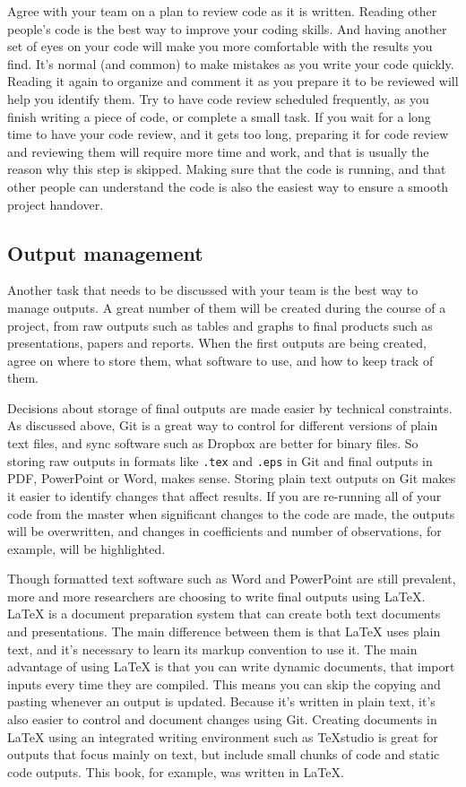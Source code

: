 Agree with your team on a plan to review code as it is written.
Reading other people's code is the best way to improve your coding skills.
And having another set of eyes on your code will make you more comfortable with the results you find.
It's normal (and common) to make mistakes as you write your code quickly.
Reading it again to organize and comment it as you prepare it to be reviewed will help you identify them.
Try to have code review scheduled frequently, as you finish writing a piece of code, or complete a small task.
If you wait for a long time to have your code review, and it gets too long,
preparing it for code review and reviewing them will require more time and work,
and that is usually the reason why this step is skipped.
Making sure that the code is running,
and that other people can understand the code is also the easiest way to ensure a smooth project handover.

\subsection{Output management}

Another task that needs to be discussed with your team is the best way to manage outputs.
A great number of them will be created during the course of a project,
from raw outputs such as tables and graphs to final products such as presentations, papers and reports.
When the first outputs are being created, agree on where to store them,
what software to use, and how to keep track of them.

Decisions about storage of final outputs are made easier by technical constraints.
As discussed above, Git is a great way to control for different versions of
plain text files, and sync software such as Dropbox are better for binary files.
So storing raw outputs in formats like \texttt{.tex} and \texttt{.eps} in Git and
final outputs in PDF, PowerPoint or Word, makes sense.
Storing plain text outputs on Git makes it easier to identify changes that affect results.
If you are re-running all of your code from the master when significant changes to the code are made,
the outputs will be overwritten, and changes in coefficients and number of observations, for example,
will be highlighted.

Though formatted text software such as Word and PowerPoint are still prevalent,
more and more researchers are choosing to write final outputs using
\LaTeX.
{\LaTeX} is a document preparation system that can create both text documents and presentations.
The main difference between them is that {\LaTeX} uses plain text,
and it's necessary to learn its markup convention to use it.
The main advantage of using {\LaTeX} is that you can write dynamic documents,
that import inputs every time they are compiled.
This means you can skip the copying and pasting whenever an output is updated.
Because it's written in plain text, it's also easier to control and document changes using Git.
Creating documents in {\LaTeX} using an integrated writing environment such as TeXstudio
is great for outputs that focus mainly on text,
but include small chunks of code and static code outputs.
This book, for example, was written in \LaTeX.

